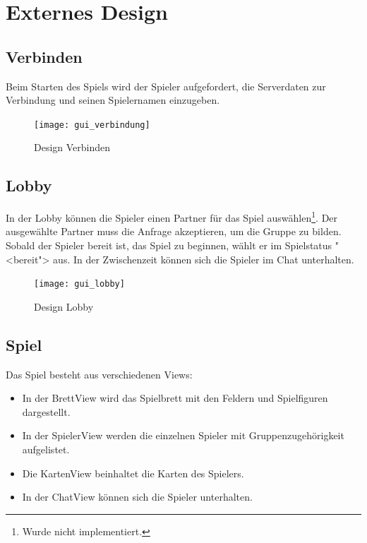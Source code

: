 \documentclass[12pt,halfparskip]{scrartcl}
\begin{document}
\clearpage
\section{Externes Design}
\label{externes_design}

\subsection{Verbinden}

Beim Starten des Spiels wird der Spieler aufgefordert, die Serverdaten zur Verbindung und seinen Spielernamen einzugeben.

\begin{figure}[h]
	\centering
	\texttt{[image: gui\_verbindung]}
	\caption{Design Verbinden}
	\label{fig:gui_verbindung}
\end{figure}

\clearpage

\subsection{Lobby}
\label{externes_design_lobby}

In der Lobby können die Spieler einen Partner für das Spiel auswählen\footnote{Wurde nicht implementiert.}. Der ausgewählte Partner muss die Anfrage akzeptieren, um die Gruppe zu bilden. Sobald der Spieler bereit ist, das Spiel zu beginnen, wählt er im Spielstatus "<bereit"> aus. In der Zwischenzeit können sich die Spieler im Chat unterhalten.

\begin{figure}[h]
	\centering
	\texttt{[image: gui\_lobby]}
	\caption{Design Lobby}
	\label{fig:gui_lobby}
\end{figure}

\clearpage

\subsection{Spiel}
\label{externes_design_spielbrett}

Das Spiel besteht aus verschiedenen Views:
\begin{itemize}
	\item In der BrettView wird das Spielbrett mit den Feldern und Spielfiguren dargestellt.
	\item In der SpielerView werden die einzelnen Spieler mit Gruppenzugehörigkeit aufgelistet.
	\item Die KartenView beinhaltet die Karten des Spielers.
	\item In der ChatView können sich die Spieler unterhalten.
\end{itemize}
\end{document}
